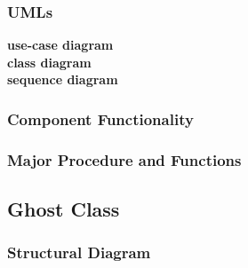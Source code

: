 \documentclass[11pt]{article}
\begin{document}
\subsubsection{UMLs}
\textbf{use-case diagram}\\
\textbf{class diagram}\\
\textbf{sequence diagram}\\
\subsubsection{Component Functionality}
\subsubsection{Major Procedure and Functions}


\subsection{Ghost Class}
\subsubsection{Structural Diagram}
\end{document}
